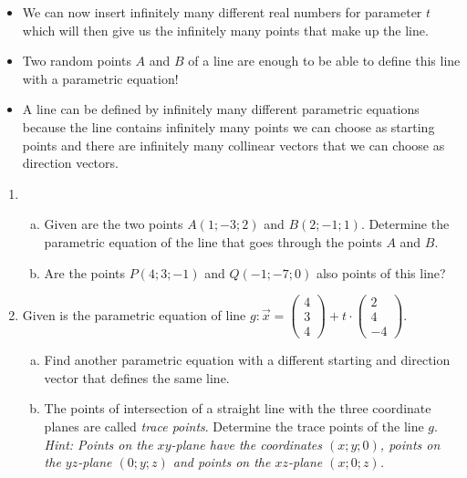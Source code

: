 \documentclass[12pt,eng]{skript_ogg}
\begin{document}
\begin{bemerkung}
\begin{itemize}
\setlength{\itemsep}{-0.5ex}
	\item We can now insert infinitely many different real numbers for parameter $t$ which will then give us the infinitely many points that make up the line.
	\item Two random points $A$ and $B$ of a line are enough to be able to define this line with a parametric equation!
	\item A line can be defined by infinitely many different parametric equations because the line contains infinitely many points we can choose as starting points and there are infinitely
many collinear vectors that we can choose as direction vectors.
\end{itemize}
\end{bemerkung}

\begin{uebung}
\begin{enumerate}[\bfseries 1.]
	\item \begin{enumerate}[(a)]
	\setlength{\itemsep}{-1ex}
		\item Given are the two points $A(1;-3;2)$ and $B(2;-1;1)$. Determine the parametric equation of the line that goes through the points $A$ and $B$.
		\item Are the points $P(4;3;-1)$ and $Q(-1;-7;0)$ also points of this line?
	\end{enumerate}

	\vspace{7.2cm}
	
	\item Given is the parametric equation of line $g:\vec{x}=\begin{pmatrix}4\\3\\4\end{pmatrix}+t\cdot \begin{pmatrix}2\\4\\-4\end{pmatrix}$.
	\begin{enumerate}[(a)]
	\setlength{\itemsep}{-1ex}
		\item Find another parametric equation with a different starting and direction vector that defines the same line.
		\item The points of intersection of a straight line with the three coordinate planes are
called \emph{trace points}. Determine the trace points of the line $g$.\\
\emph{Hint: Points on the $xy$-plane have the coordinates $(x;y;0)$, points on the $yz$-plane
$(0;y;z)$ and points on the $xz$-plane $(x;0;z)$.}
	\end{enumerate}
	
	\vspace{7.2cm}
\end{enumerate}
\end{uebung}
\end{document}
